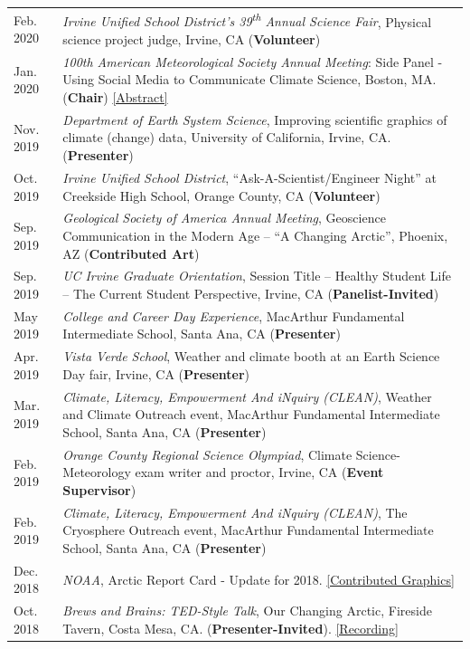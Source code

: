 \documentclass[margin,line,palatino,courier,10pt]{res}
\begin{document}
\begin{resume}
\begin{tabular}{@{}p{0.9in}p{4in}}
Feb. 2020 & \textit{Irvine Unified School District's 39\textsuperscript{th} Annual Science Fair}, Physical science project judge, Irvine, CA (\textbf{Volunteer})\\
Jan. 2020 & \textit{100th American Meteorological Society Annual Meeting}: Side Panel - Using Social Media to Communicate Climate Science, Boston, MA. (\textbf{Chair}) \href{https://ams.confex.com/ams/2020Annual/meetingapp.cgi/Session/53195}{[Abstract]}\\
Nov. 2019 & \textit{Department of Earth System Science}, Improving scientific graphics of climate (change) data, University of California, Irvine, CA. (\textbf{Presenter})\\
Oct. 2019 & \textit{Irvine Unified School District}, ``Ask-A-Scientist/Engineer Night'' at Creekside High School, Orange County, CA (\textbf{Volunteer})\\
Sep. 2019 & \textit{Geological Society of America Annual Meeting}, Geoscience Communication in the Modern Age -- ``A Changing Arctic'', Phoenix, AZ (\textbf{Contributed Art})\\
Sep. 2019 & \textit{UC Irvine Graduate Orientation}, Session Title -- Healthy Student Life -- The Current Student Perspective, Irvine, CA (\textbf{Panelist-Invited})\\
May 2019 & \textit{College and Career Day Experience}, MacArthur Fundamental Intermediate School, Santa Ana, CA (\textbf{Presenter})\\
Apr. 2019 & \textit{Vista Verde School}, Weather and climate booth at an Earth Science Day fair, Irvine, CA (\textbf{Presenter})\\
Mar. 2019 & \textit{Climate, Literacy, Empowerment And iNquiry (CLEAN)}, Weather and Climate Outreach event, MacArthur Fundamental Intermediate School, Santa Ana, CA (\textbf{Presenter})\\
Feb. 2019 & \textit{Orange County Regional Science Olympiad}, Climate Science-Meteorology exam writer and proctor, Irvine, CA (\textbf{Event Supervisor})\\
Feb. 2019 & \textit{Climate, Literacy, Empowerment And iNquiry (CLEAN)}, The Cryosphere Outreach event, MacArthur Fundamental Intermediate School, Santa Ana, CA (\textbf{Presenter})\\
Dec. 2018 & \textit{NOAA}, Arctic Report Card - Update for 2018. \href{https://www.youtube.com/watch?v=XntO9a-NpeM}{[Contributed Graphics]}\\
Oct. 2018 & \textit{Brews and Brains: TED-Style Talk}, Our Changing Arctic, Fireside Tavern, Costa Mesa, CA. (\textbf{Presenter-Invited}). \href{https://www.youtube.com/watch?v=A5qQpDtOdvg}{[Recording]}\\

\end{tabular}
\end{resume}
\end{document}
